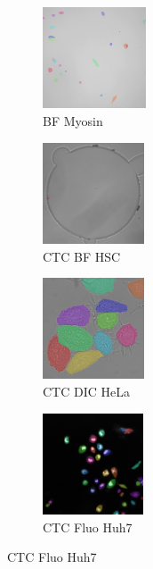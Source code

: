 \documentclass[../cellseek_paper.tex]{subfiles}
\begin{document}
\begin{figure}[H]
  \vspace{0.8em}

  \begin{subfigure}{0.23\textwidth}
    \centering
    \includegraphics[width=\textwidth,height=3cm]{images/examples/myosin_segmented.jpg}
    \caption{\footnotesize BF Myosin}
    \label{fig:myosin}
  \end{subfigure}
  \hfill
  \begin{subfigure}{0.23\textwidth}
    \centering
    \includegraphics[width=\textwidth,height=3cm]{images/examples/hsc_segmented.jpg}
    \caption{\footnotesize CTC BF HSC}
    \label{fig:hsc}
  \end{subfigure}
  \hfill
  \begin{subfigure}{0.23\textwidth}
    \centering
    \includegraphics[width=\textwidth,height=3cm]{images/examples/hela_segmented.jpg}
    \caption{\footnotesize CTC DIC HeLa}
    \label{fig:hela}
  \end{subfigure}
  \hfill
  \begin{subfigure}{0.23\textwidth}
    \centering
    \includegraphics[width=\textwidth,height=3cm]{images/examples/huh7_segmented.jpg}
    \caption{\footnotesize CTC Fluo Huh7}
    \label{fig:huh7}
  \end{subfigure}


\end{figure}
\end{document}
